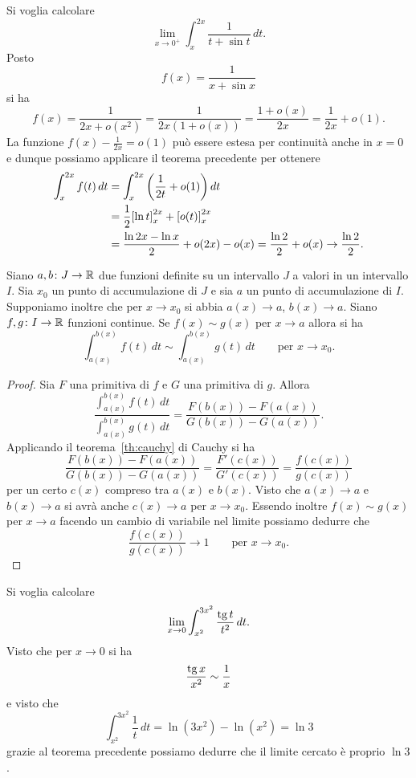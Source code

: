 \begin{example}
Si voglia calcolare
\[
  \lim_{x\to 0^+} \int_{x}^{2x} \frac{1}{t+\sin t}\, dt.
\]
Posto
\[
  f(x) = \frac{1}{x+\sin x}
\]
si ha
\[
 f(x)
  = \frac{1}{2x+o(x^2)} = \frac{1}{2x(1+o(x))}
  = \frac{1+o(x)}{2x} = \frac{1}{2x} + o(1).
\]
La funzione $f(x)-\frac 1{2x} = o(1)$
può essere estesa per continuità anche in $x=0$
e dunque possiamo applicare il teorema precedente
per ottenere
\begin{align*}
  \int_x^{2x} f(t)\, dt
  &= \int_x^{2x} {\left( \frac 1 {2t} + o(1) \right)}\, dt \\
  &= \frac 1 2 {\left[ \ln t \right]}_x^{2x} +  {\left[ o(t) \right]}_x^{2x} \\
  &= \frac {\ln 2x - \ln x} 2 + o(2x) - o(x)
  = \frac {\ln 2} 2 + o(x) \to \frac{\ln 2}{2}.
\end{align*}
\end{example}

\begin{theorem}
Siano $a,b\colon J \to {\mathbb R}$ due funzioni definite
su un intervallo $J$ a valori in un intervallo $I$.
Sia $x_0$ un punto di accumulazione di $J$ e sia $a$ un punto
di accumulazione di $I$. Supponiamo inoltre
che per $x\to x_0$ si abbia $a(x)\to a$, $b(x)\to a$.
Siano $f,g\colon I \to {\mathbb R}$ funzioni continue.
Se $f(x)\sim g(x)$ per $x\to a$ allora si ha
\[
  \int_{a(x)}^{b(x)} f(t)\, dt
  \sim \int_{a(x)}^{b(x)} g(t)\, dt
  \qquad \text{per $x\to x_0$}.
\]
\end{theorem}
%
\begin{proof}
Sia $F$ una primitiva di $f$ e $G$ una primitiva di $g$.
Allora
\[
  \frac{\displaystyle\int_{a(x)}^{b(x)}f(t)\, dt}{\displaystyle\int_{a(x)}^{b(x)} g(t)\, dt}
  = \frac{F(b(x)) - F(a(x))}{G(b(x))-G(a(x))}.
\]
Applicando il teorema~\ref{th:cauchy} di Cauchy si ha
\[
\frac{F(b(x)) - F(a(x))}{G(b(x))-G(a(x))}
= \frac{F'(c(x))}{G'(c(x))}
= \frac{f(c(x))}{g(c(x))}
\]
per un certo $c(x)$ compreso tra $a(x)$ e $b(x)$.
Visto che $a(x)\to a$ e $b(x)\to a$ si avrà anche $c(x)\to a$
per $x\to x_0$. Essendo inoltre $f(x)\sim g(x)$ per $x\to a$
facendo un cambio di variabile nel limite possiamo dedurre che
\[
\frac{f(c(x))}{g(c(x))} \to 1 \qquad \text{per $x\to x_0$}.
\]
\end{proof}

\begin{example}
Si voglia calcolare
\[
  \lim_{x\to 0 }\int_{x^2}^{3x^2} \frac{\operatorname{tg} t}{t^2}\, dt.
\]
Visto che per $x\to 0$ si ha
\[
  \frac{\operatorname{tg} x}{x^2} \sim \frac 1 x
\]
e visto che
\[
  \int_{x^2}^{3x^2}\frac{1}{t}\, dt
  = \ln(3x^2) - \ln(x^2) = \ln 3
\]
grazie al teorema precedente
possiamo dedurre che il limite cercato è proprio $\ln 3$.
\end{example}

